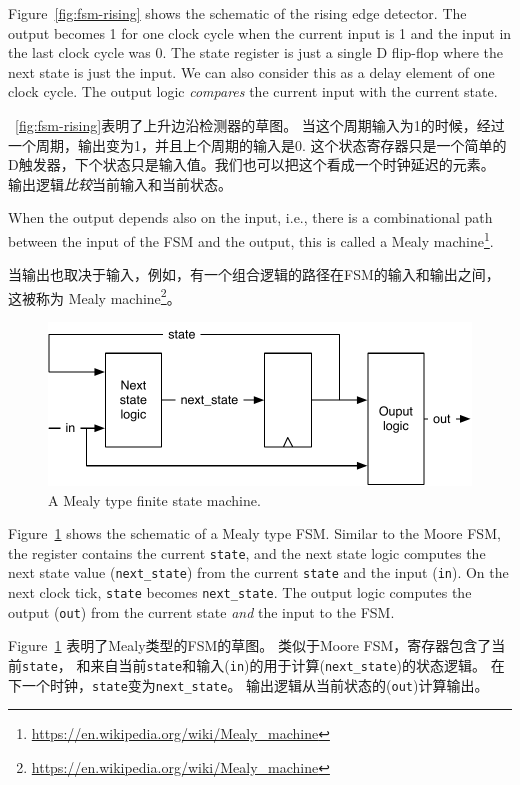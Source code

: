 \documentclass[%
    10pt,
    headinclude, footexclude,
    openright, %
    notitlepage,
    cleardoubleempty,
    headsepline,
    pointlessnumbers,
    bibtotoc, idxtotoc,
    ]{scrbook}
\newcommand{\code}[1]{{\small{\texttt{#1}}}}
\newcommand{\scale}{0.7}
\newcommand{\myref}[2]{\href{#1}{#2}}
\renewcommand{\myref}[2]{{#2}{\footnote{\url{#1}}}}
\begin{document}
Figure~\ref{fig:fsm-rising} shows the schematic of the rising edge detector.
The output becomes 1 for one clock cycle when the current input is 1
and the input in the last clock cycle was 0.
The state register is just a single D flip-flop where the next state
is just the input. We can also consider this as a delay element of one
clock cycle. The output logic \emph{compares} the current
input with the current state.

~\ref{fig:fsm-rising}表明了上升边沿检测器的草图。
当这个周期输入为1的时候，经过一个周期，输出变为1，并且上个周期的输入是0.
这个状态寄存器只是一个简单的D触发器，下个状态只是输入值。我们也可以把这个看成一个时钟延迟的元素。
输出逻辑\emph{比较}当前输入和当前状态。

When the output depends also on the input, i.e., there is a combinational path between
the input of the FSM and the output, this is called a
\myref{https://en.wikipedia.org/wiki/Mealy_machine}{Mealy machine}.

当输出也取决于输入，例如，有一个组合逻辑的路径在FSM的输入和输出之间，这被称为
\myref{https://en.wikipedia.org/wiki/Mealy_machine}{Mealy machine}。

\begin{figure}
  \centering
  \includegraphics[scale=\scale]{figures/mealy}
  \caption{A Mealy type finite state machine.}
  \label{fig:mealy}
\end{figure}

Figure~\ref{fig:mealy} shows the schematic of a Mealy type FSM.
Similar to the Moore FSM, the register contains the current \code{state}, and
the next state logic computes the next state value (\code{next\_state})
from the current \code{state} and the input (\code{in}).
On the next clock tick, \code{state} becomes \code{next\_state}.
The output logic computes the output (\code{out}) from the current state
\emph{and} the input to the FSM.

Figure~\ref{fig:mealy} 表明了Mealy类型的FSM的草图。
类似于Moore FSM，寄存器包含了当前\code{state}，
和来自当前\code{state}和输入(\code{in})的用于计算(\code{next\_state})的状态逻辑。
在下一个时钟，\code{state}变为\code{next\_state}。
输出逻辑从当前状态的(\code{out})计算输出。
\end{document}
